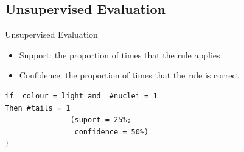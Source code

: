 \documentclass{beamer}
\begin{document}

% 
% 
% 


\subsection{Unsupervised Evaluation}


\begin{frame}[fragile]{Unsupervised Evaluation}

\begin{itemize}
 \item \alert{Support}: the proportion of times that the rule applies
 \item \alert{Confidence}: the proportion of times that the rule is correct
\end{itemize}

\begin{verbatim}
if  colour = light and  #nuclei = 1 
Then #tails = 1   	
               (suport = 25%; 
                confidence = 50%)
}
\end{verbatim}


\end{frame}


% 
% 
% 
% 
% 
\end{document}

